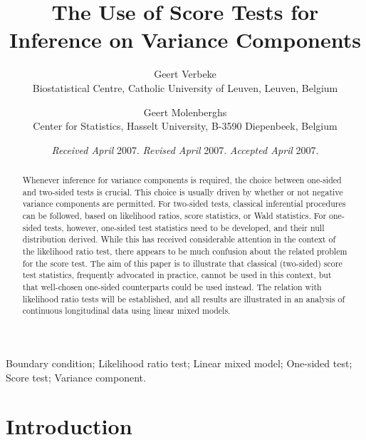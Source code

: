 \documentclass[useAMS,usenatbib,referee]{biom}
\title[Score Tests for Variance Components]{The Use of Score Tests for
Inference on Variance Components}
\author
{Geert Verbeke\emailx{geert.verbeke@med.kuleuven.be} \\
Biostatistical Centre,  Catholic University of Leuven, Leuven, Belgium
\and
Geert Molenberghs\emailx{geert.molenberghs@uhasselt.be} \\
Center for Statistics, Hasselt University, B-3590 Diepenbeek, Belgium}
\begin{document}

\date{{\it Received April} 2007. {\it Revised April} 2007.  {\it
Accepted April} 2007.}

\pagerange{\pageref{firstpage}--\pageref{lastpage}} 


\label{firstpage}


\begin{abstract}
Whenever inference for variance components is required, the choice
between one-sided and two-sided tests is crucial. This choice is
usually driven by whether or not negative variance components are
permitted. For two-sided tests, classical inferential procedures can
be followed, based on likelihood ratios, score statistics, or Wald
statistics. For one-sided tests, however, one-sided test statistics
need to be developed, and their null distribution derived. While this
has received considerable attention in the context of the likelihood
ratio test, there appears to be much confusion about the related
problem for the score test. The aim of this paper is to illustrate
that classical (two-sided) score test statistics, frequently advocated
in practice, cannot be used in this context, but that well-chosen
one-sided counterparts could be used instead. The relation with
likelihood ratio tests will be established, and all results are
illustrated in an analysis of continuous longitudinal data using
linear mixed models.
\end{abstract}

\begin{keywords}
Boundary condition; Likelihood ratio test; Linear mixed model;
One-sided test; Score test; Variance component.
\end{keywords}

\maketitle

\section{Introduction \label{section intro}}
\end{document}
